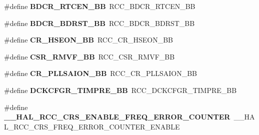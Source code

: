 \begin{DoxyCompactItemize}
\item 
\hypertarget{group___h_a_l___r_c_c___aliased_gaf70aaf70b0752ccb3a60307b2fb46038}{\#define {\bfseries B\-D\-C\-R\-\_\-\-R\-T\-C\-E\-N\-\_\-\-B\-B}~R\-C\-C\-\_\-\-B\-D\-C\-R\-\_\-\-R\-T\-C\-E\-N\-\_\-\-B\-B}\label{group___h_a_l___r_c_c___aliased_gaf70aaf70b0752ccb3a60307b2fb46038}

\item 
\hypertarget{group___h_a_l___r_c_c___aliased_ga892fdf297b85b85cbaf0723649b31818}{\#define {\bfseries B\-D\-C\-R\-\_\-\-B\-D\-R\-S\-T\-\_\-\-B\-B}~R\-C\-C\-\_\-\-B\-D\-C\-R\-\_\-\-B\-D\-R\-S\-T\-\_\-\-B\-B}\label{group___h_a_l___r_c_c___aliased_ga892fdf297b85b85cbaf0723649b31818}

\item 
\hypertarget{group___h_a_l___r_c_c___aliased_ga08230c355dd58b92f14444c65521e248}{\#define {\bfseries C\-R\-\_\-\-H\-S\-E\-O\-N\-\_\-\-B\-B}~R\-C\-C\-\_\-\-C\-R\-\_\-\-H\-S\-E\-O\-N\-\_\-\-B\-B}\label{group___h_a_l___r_c_c___aliased_ga08230c355dd58b92f14444c65521e248}

\item 
\hypertarget{group___h_a_l___r_c_c___aliased_ga69d10c519fec30b0177c26dbf7d44e02}{\#define {\bfseries C\-S\-R\-\_\-\-R\-M\-V\-F\-\_\-\-B\-B}~R\-C\-C\-\_\-\-C\-S\-R\-\_\-\-R\-M\-V\-F\-\_\-\-B\-B}\label{group___h_a_l___r_c_c___aliased_ga69d10c519fec30b0177c26dbf7d44e02}

\item 
\hypertarget{group___h_a_l___r_c_c___aliased_gab84e7d3874237ee56e5cb3a26644cd13}{\#define {\bfseries C\-R\-\_\-\-P\-L\-L\-S\-A\-I\-O\-N\-\_\-\-B\-B}~R\-C\-C\-\_\-\-C\-R\-\_\-\-P\-L\-L\-S\-A\-I\-O\-N\-\_\-\-B\-B}\label{group___h_a_l___r_c_c___aliased_gab84e7d3874237ee56e5cb3a26644cd13}

\item 
\hypertarget{group___h_a_l___r_c_c___aliased_gaff212f4f5168f26347acf1abbb331961}{\#define {\bfseries D\-C\-K\-C\-F\-G\-R\-\_\-\-T\-I\-M\-P\-R\-E\-\_\-\-B\-B}~R\-C\-C\-\_\-\-D\-C\-K\-C\-F\-G\-R\-\_\-\-T\-I\-M\-P\-R\-E\-\_\-\-B\-B}\label{group___h_a_l___r_c_c___aliased_gaff212f4f5168f26347acf1abbb331961}

\item 
\hypertarget{group___h_a_l___r_c_c___aliased_gae1dcfa2b4d26da3bd30866860476fe97}{\#define {\bfseries \-\_\-\-\_\-\-H\-A\-L\-\_\-\-R\-C\-C\-\_\-\-C\-R\-S\-\_\-\-E\-N\-A\-B\-L\-E\-\_\-\-F\-R\-E\-Q\-\_\-\-E\-R\-R\-O\-R\-\_\-\-C\-O\-U\-N\-T\-E\-R}~\-\_\-\-\_\-\-H\-A\-L\-\_\-\-R\-C\-C\-\_\-\-C\-R\-S\-\_\-\-F\-R\-E\-Q\-\_\-\-E\-R\-R\-O\-R\-\_\-\-C\-O\-U\-N\-T\-E\-R\-\_\-\-E\-N\-A\-B\-L\-E}\label{group___h_a_l___r_c_c___aliased_gae1dcfa2b4d26da3bd30866860476fe97}


\end{DoxyCompactItemize}
